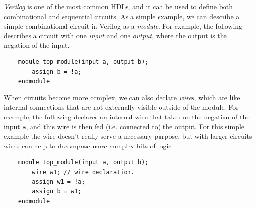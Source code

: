 \documentclass[10pt,a4paper]{article}
\begin{document}
\textit{Verilog} is one of the most common HDLs, and it can be used to define both combinational and sequential circuits. As a simple example, we can describe a simple combinational circuit in Verilog as a \textit{module}. For example, the following describes a circuit with one \textit{input} and one \textit{output}, where the output is the negation of the input.
\begin{verbatim}
    module top_module(input a, output b);
        assign b = !a;
    endmodule
\end{verbatim}
When circuits become more complex, we can also declare \textit{wires}, which are like internal connections that are not externally visible outside of the module. For example, the following declares an internal wire that takes on the negation of the input \verb|a|, and this wire is then fed (i.e. connected to) the output. For this simple example the wire doesn't really serve a necessary purpose, but with larger circuits wires can help to decompose more complex bits of logic.
\begin{verbatim}
    module top_module(input a, output b);
        wire w1; // wire declaration.
        assign w1 = !a;
        assign b = w1;
    endmodule
\end{verbatim}



\end{document}
